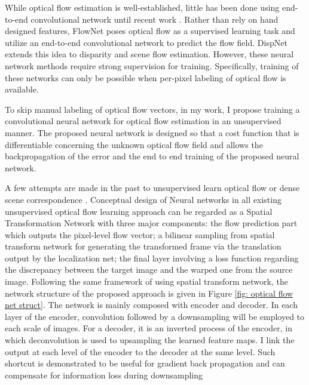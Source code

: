 \documentclass{iitthesis}
\begin{document}
While optical flow estimation is well-established, little has been done using end-to-end convolutional network until recent work \cite{7410673}\cite{Ranjan_2017_CVPR}. Rather than rely on hand designed features, FlowNet \cite{7410673} poses optical flow as a supervised learning task and utilize an end-to-end convolutional network to predict the flow field. DispNet \cite{mayer2016large} extends this idea to disparity and scene flow estimation. However, these neural network methods require strong supervision for training. Specifically, training of these networks can only be possible when per-pixel labeling of optical flow is available.

To skip manual labeling of optical flow vectors, in my work, I propose training a convolutional neural network for optical flow estimation in an unsupervised manner. The proposed neural network is designed so that a cost function that is differentiable concerning the unknown optical flow field and allows the backpropagation of the error and the end to end training of the proposed neural network.

A few attempts are made in the past to unsupervised learn optical flow or dense scene correspondence \cite{ahmadi2016unsupervised}\cite{ren2017unsupervised}\cite{DBLP:journals/corr/YuHD16}. Conceptual design of Neural networks in all existing unsupervised optical flow learning approach can be regarded as a Spatial Transformation Network \cite{NIPS2015_5854} with three major components: the flow prediction part which outputs the pixel-level flow vector; a bilinear sampling from spatial transform network \cite{NIPS2015_5854} for generating the transformed frame via the translation output by the localization net; the final layer involving a loss function regarding the discrepancy between the target image and the warped one from the source image. Following the same framework of using spatial transform network, the network structure of the proposed approach is given in Figure \ref{fig: optical flow net struct}. The network is mainly composed with encoder and decoder. In each layer of the encoder, convolution followed by a downsampling will be employed to each scale of images. For a decoder, it is an inverted process of the encoder, in which deconvolution is used to upsampling the learned feature maps. I link the output at each level of the encoder to the decoder at the same level. Such shortcut is demonstrated to be useful for gradient back propagation and can compensate for information loss during downsampling \cite{ronneberger2015u} 
\end{document}
